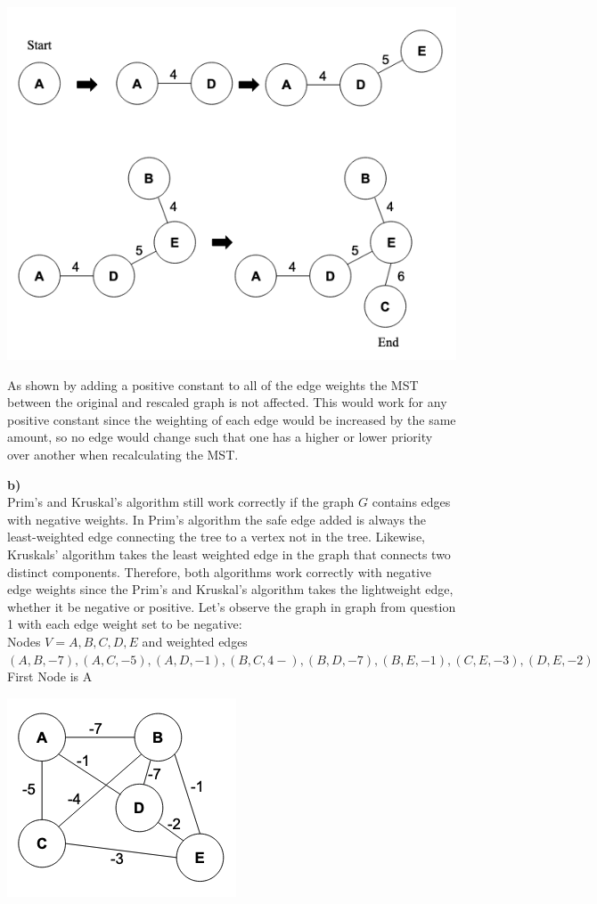\documentclass{article}
\begin{document}
\begin{center}
    \includegraphics[width=1\textwidth]{2a-2.png}
\end{center}

As shown by adding a positive constant to all of the edge weights the MST between the original and rescaled graph is not affected. This would work for any positive constant since the weighting of each edge would be increased by the same amount, so no edge would change such that one has a higher or lower priority over another when recalculating the MST.

\bigskip
{\bf b)}\\
Prim's and Kruskal's algorithm still work correctly if the graph $G$ contains edges with negative weights. In Prim's algorithm the safe edge added is always the least-weighted edge connecting the tree to a vertex not in the tree. Likewise, Kruskals' algorithm takes the least weighted edge in the graph that connects two distinct components. Therefore, both algorithms work correctly with negative edge weights since the Prim's and Kruskal's algorithm takes the lightweight edge, whether it be negative or positive. Let's observe the graph in graph from question 1 with each edge weight set to be negative:\\


Nodes $V={A,B,C,D,E}$ and weighted edges\\
$(A,B,-7),(A,C,-5),(A,D,-1),(B,C,4-),(B,D,-7),(B,E,-1),(C,E,-3),(D,E,-2)$\\

\smallskip
First Node is A
\begin{center}
    \includegraphics[width=.4\textwidth]{4.png}
\end{center}
\end{document}
